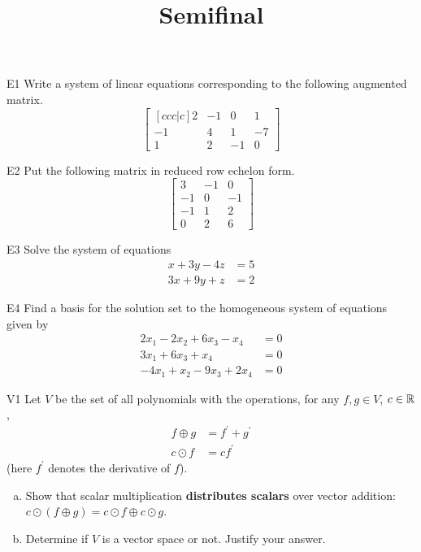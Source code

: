 \documentclass{sbgLAsemi}
\title{Semifinal}
\begin{document}
\begin{problem}{E1}
Write a system of linear equations corresponding to the following
augmented matrix.
\[
\begin{bmatrix}[ccc|c]
2 & -1 & 0 & 1  \\
-1 & 4 & 1 & -7  \\
1 & 2 & -1 & 0
\end{bmatrix}
\]
\end{problem}

\begin{problem}{E2}
Put the following matrix in reduced row echelon form.
$$\begin{bmatrix}
 3 & -1 & 0 \\
 -1 & 0 & -1 \\
 -1 & 1 & 2 \\
 0 & 2 & 6
\end{bmatrix}$$
\end{problem}

\begin{problem}{E3}
Solve the system of equations
\begin{align*}
x+3y-4z &= 5 \\
3x+9y+z &= 2
\end{align*}
\end{problem}

\begin{problem}{E4}
Find a basis for the solution set to the homogeneous system of equations
given by
\begin{align*}
2x_1-2x_2+6x_3-x_4 &=0 \\
3x_1+6x_3+x_4 &=0 \\
-4x_1+x_2-9x_3+2x_4&=0
\end{align*}
\end{problem}

\begin{problem}{V1}
Let $V$ be the set of all polynomials with the operations, for any $f, g \in V$, $c \in \mathbb{R}$,
\begin{align*}
f \oplus g &= f^\prime + g^\prime \\
c \odot f &= c f^\prime
\end{align*}
(here $f^\prime$ denotes the derivative of $f$).
\begin{enumerate}[(a)]
\item Show that scalar multiplication \textbf{distributes scalars} over
      vector addition:
      \(c\odot(f \oplus g)=
      c\odot f \oplus c\odot g\).
\item Determine if $V$ is a vector space or not.  Justify your answer.
\end{enumerate}
\end{problem}
\end{document}
